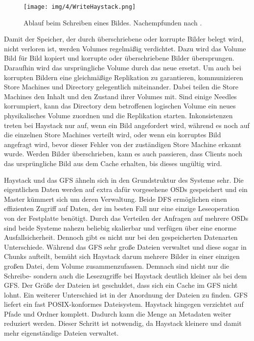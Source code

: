\documentclass[12pt,oneside,a4paper,parskip]{scrbook}
\begin{document}
\begin{figure}[h]
  \centering
  \texttt{[image: img/4/WriteHaystack.png]}
  \caption[Ablauf beim Schreiben eines Bildes in Haystack.]{ Ablauf beim Schreiben eines Bildes. Nachempfunden nach \cite{haystack}.}
  \label{writeHaystack}
\end{figure}

Damit der Speicher, der durch überschriebene oder korrupte Bilder belegt wird, nicht verloren ist, werden Volumes regelmäßig verdichtet. Dazu wird das Volume Bild für Bild kopiert und korrupte oder überschriebene Bilder übersprungen. Daraufhin wird das ursprüngliche Volume durch das neue ersetzt. Um auch bei korrupten Bildern eine gleichmäßige Replikation zu garantieren, kommunizieren Store Machines und Directory gelegentlich miteinander. Dabei teilen die Store Machines den Inhalt und den Zustand ihrer Volumes mit. Sind einige Needles korrumpiert, kann das Directory dem betroffenen logischen Volume ein neues physikalisches Volume zuordnen und die Replikation starten. Inkonsistenzen treten bei Haystack nur auf, wenn ein Bild angefordert wird, während es noch auf die einzelnen Store Machines verteilt wird, oder wenn ein korruptes Bild angefragt wird, bevor dieser Fehler von der zuständigen Store Machine erkannt wurde. Werden Bilder überschrieben, kann es auch passieren, dass Clients noch das ursprüngliche Bild aus dem Cache erhalten, bis dieses ungültig wird.

Haystack und das GFS ähneln sich in den Grundstruktur des Systeme sehr. Die eigentlichen Daten werden auf extra dafür vorgesehene OSDs gespeichert und ein Master kümmert sich um deren Verwaltung. Beide DFS ermöglichen einen effizienten Zugriff auf Daten, der im besten Fall nur eine einzige Leseoperation von der Festplatte benötigt. Durch das Verteilen der Anfragen auf mehrere OSDs sind beide Systeme nahezu beliebig skalierbar und verfügen über eine enorme Ausfallsicherheit. Dennoch gibt es nicht nur bei den gespeicherten Datenarten Unterschiede. Während das GFS sehr große Dateien verwaltet und diese sogar in Chunks aufteilt, bemüht sich Haystack darum mehrere Bilder in einer einzigen großen Datei, dem Volume zusammenzufassen. Demnach sind nicht nur die Schreibe- sondern auch die Lesezugriffe bei Haystack deutlich kleiner als bei dem GFS. Der Größe der Dateien ist geschuldet, dass sich ein Cache im GFS nicht lohnt. Ein weiterer Unterschied ist in der Anordnung der Dateien zu finden. GFS liefert ein fast POSIX-konformes Dateisystem. Haystack hingegen verzichtet auf Pfade und Ordner komplett. Dadurch kann die Menge an Metadaten weiter reduziert werden. Dieser Schritt ist notwendig, da Haystack kleinere und damit mehr eigenständige Dateien verwaltet. 
\end{document}
